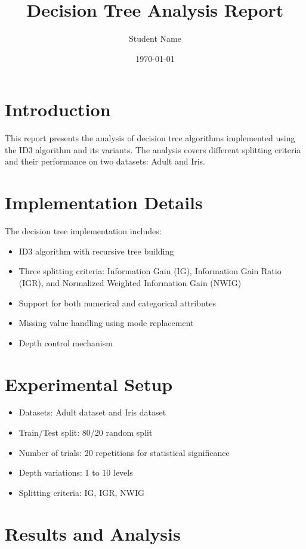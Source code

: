 \documentclass[11pt]{article}
\title{Decision Tree Analysis Report}
\author{Student Name}
\date{\today}
\begin{document}
\maketitle

\section{Introduction}
This report presents the analysis of decision tree algorithms implemented using the ID3 algorithm and its variants. The analysis covers different splitting criteria and their performance on two datasets: Adult and Iris.

\section{Implementation Details}
The decision tree implementation includes:
\begin{itemize}
    \item ID3 algorithm with recursive tree building
    \item Three splitting criteria: Information Gain (IG), Information Gain Ratio (IGR), and Normalized Weighted Information Gain (NWIG)
    \item Support for both numerical and categorical attributes
    \item Missing value handling using mode replacement
    \item Depth control mechanism
\end{itemize}

\section{Experimental Setup}
\begin{itemize}
    \item Datasets: Adult dataset and Iris dataset
    \item Train/Test split: 80/20 random split
    \item Number of trials: 20 repetitions for statistical significance
    \item Depth variations: 1 to 10 levels
    \item Splitting criteria: IG, IGR, NWIG
\end{itemize}

\section{Results and Analysis}
\end{document}
